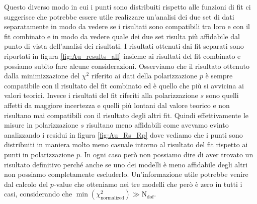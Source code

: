 \documentclass[
    prb,altaffilletter,citeautoscript,
    amsmath,amssymb,
    showpacs,showkeys,floatfix,
    reprint
]{revtex4-1}
\begin{document}
Questo diverso modo in cui i punti sono distribuiti rispetto alle funzioni di fit ci suggerisce che potrebbe essere utile realizzare un'analisi dei due set di dati separatamente in modo da vedere se i risultati sono compatibili tra loro e con il fit combinato e in modo da vedere quale dei due set risulta più affidabile dal punto di vista dell'analisi dei risultati. I risultati ottenuti dai fit separati sono riportati in figura \ref{fig:Au_results_all} insieme ai risultati del fit combinato e possiamo subito fare alcune considerazioni. Osserviamo che il risultato ottenuto dalla minimizzazione del $\chi^2$ riferito ai dati della polarizzazione $p$ è sempre compatibile con il risultato del fit combinato ed è quello che più si avvicina ai valori teorici. Invece i risultati del fit riferiti alla polarizzazione $s$ sono quelli affetti da maggiore incertezza e quelli più lontani dal valore teorico e non risultano mai compatibili con il risultato degli altri fit. Quindi effettivamente le misure in polarizzazione $s$ risultano meno affidabili come avevamo evinto analizzando i residui in figura \ref{fig:Au_Rs_Rp} dove vediamo che i punti sono distribuiti in maniera molto meno casuale intorno al risultato del fit rispetto ai punti in polarizzazione $p$. In ogni caso però non possiamo dire di aver trovato un risultato definitivo perché anche se uno dei modelli è meno affidabile degli altri non possiamo completamente escluderlo. Un'informazione utile potrebbe venire dal calcolo del $p$-value che otteniamo nei tre modelli che però è zero in tutti i casi, considerando che $\min(\chi^2_\mathrm{normalized})\gg\mathrm{N_{dof}}$.
\end{document}
